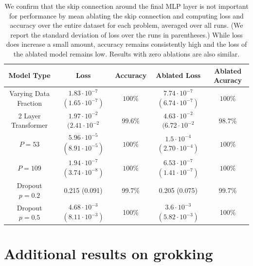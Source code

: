 \documentclass{article} %
\begin{document}
\begin{table}[]
    \centering
    \small
    \begin{tabular}{c|c|c|c|c}
         \textbf{Model Type} & \textbf{Loss} & \textbf{Accuracy}  & \textbf{Ablated Loss} & \textbf{Ablated Acuracy}  \\
         \hline 
         Varying Data Fraction & $1.83 \cdot 10^{-7}$ $(1.65 \cdot 10^{-7})$ & $100\%$ & $7.74 \cdot 10^{-7}$ $(6.74 \cdot 10^{-7})$ & $100\%$\\
         2 Layer Transformer & $1.97 \cdot 10^{-2}$ $(2.41 \cdot 10^{-2}$ & $99.6\%$ & $4.63 \cdot 10^{-2}$ $(6.72 \cdot 10^{-2}$ & $98.7\%$\\
         $P=53$ & $5.96 \cdot 10^{-5}$ $(8.91 \cdot 10^{-5})$ & $100\%$ & $1.5 \cdot 10^{-4}$ $(2.70 \cdot 10^{-4})$ & $100\%$ \\
         $P=109$ & $1.94 \cdot 10^{-7}$ $(3.74 \cdot 10^{-8})$ & $100\%$ & $6.53 \cdot 10^{-7}$ $ (1.41 \cdot 10^{-7})$ & $100\%$\\
         Dropout $p=0.2$ & 0.215 (0.091) & 99.7\% & 0.205 (0.075) & 99.7\%\\
         Dropout $p=0.5$ & $4.68 \cdot 10^{-3}$ $(8.11 \cdot 10^{-3})$ & 100\% & $3.6 \cdot 10^{-3}$ $(5.82 \cdot 10 ^{-3})$ & 100\%
    \end{tabular}
    \caption{We confirm that the skip connection around the final MLP layer is not important for performance by mean ablating the skip connection and computing loss and accuracy over the entire dataset for each problem, averaged over all runs. (We report the standard deviation of loss over the runs in parentheses.) While loss does increase a small amount, accuracy remains consistently high and the loss of the ablated model remains low. Results with zero ablations are also similar. }
    \label{tab:mean_ablate_skip}
\end{table}


\section{Additional results on grokking}
\label{sec:additional-grokking}
\end{document}
